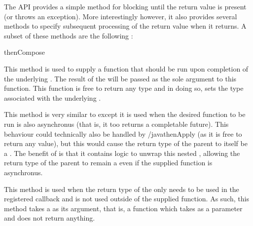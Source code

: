The API provides a simple  method for blocking until the return value is present (or throws an exception). More interestingly however, it also provides several methods to specify subsequent processing of the return value when it returns. A subset of these methods are the following \cite{javaCfArticle}:

\begin{labeling}{thenCompose}
	\item [thenApply] This method is used to supply a function that should be run upon completion of the underlying . The result of the  will be passed as the sole argument to this function. This function is free to return any type and in doing so, sets the type associated with the underlying . 
	\item [thenCompose] This method is very similar to  except it is used when the desired function to be run is also asynchronus (that is, it too returns a completable future). This behaviour could technically also be handled by /java{thenApply} (as it is free to return any value), but this would cause the return type of the parent  to itself be a . The benefit of  is that it contains logic to unwrap this nested , allowing the return type of the parent to remain a  even if the supplied function is asynchronus.
	\item [thenAccept] This method is used when the return type of the  only needs to be used in the registered callback and is not used outside of the supplied function. As such, this method takes a  as its argument, that is, a function which takes  as a parameter and does not return anything.  
\end{labeling}



